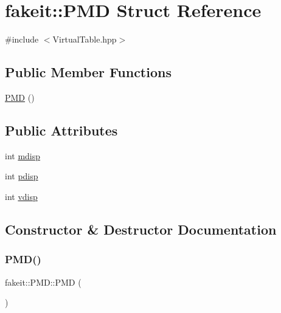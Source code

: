 \hypertarget{structfakeit_1_1PMD}{}\section{fakeit\+::P\+MD Struct Reference}
\label{structfakeit_1_1PMD}


{\ttfamily \#include $<$Virtual\+Table.\+hpp$>$}

\subsection*{Public Member Functions}
\begin{DoxyCompactItemize}
\item 
\mbox{\hyperlink{structfakeit_1_1PMD_ab2f46d6a13a8644c8f697c49d32c43f7}{P\+MD}} ()
\end{DoxyCompactItemize}
\subsection*{Public Attributes}
\begin{DoxyCompactItemize}
\item 
int \mbox{\hyperlink{structfakeit_1_1PMD_a350eb920bfbfbf46295bb82dc5592399}{mdisp}}
\item 
int \mbox{\hyperlink{structfakeit_1_1PMD_ac9c12588abe271bf97903aaac006bca3}{pdisp}}
\item 
int \mbox{\hyperlink{structfakeit_1_1PMD_a7262cf758cef2cebfceb2cd374c5e8ce}{vdisp}}
\end{DoxyCompactItemize}


\subsection{Constructor \& Destructor Documentation}
\mbox{\label{structfakeit_1_1PMD_ab2f46d6a13a8644c8f697c49d32c43f7}} 
\subsubsection{\texorpdfstring{PMD()}{PMD()}}
{\footnotesize\ttfamily fakeit\+::\+P\+M\+D\+::\+P\+MD (\begin{DoxyParamCaption}{ }\end{DoxyParamCaption})\hspace{0.3cm}{\ttfamily [inline]}}




